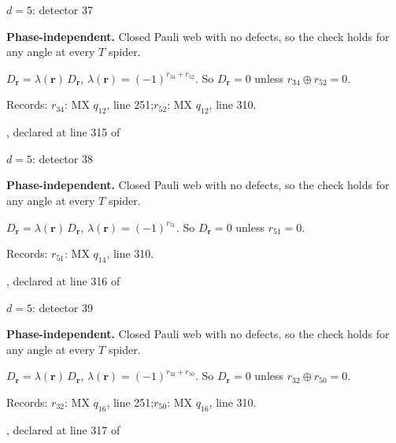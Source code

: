 \label{d5_det037}
{\Large $d=5$: detector 37}\par
\textbf{Phase-independent.} Closed Pauli web with no defects, so the check holds for any angle at every $T$ spider.
\begin{center}
\end{center}
\vspace{-1mm}
$D_{\boldsymbol r}=\lambda(\boldsymbol r)\,D_{\boldsymbol r}$, \quad $\lambda(\boldsymbol r)=(-1)^{r_{34}+r_{52}}$. \qquad So $D_{\boldsymbol r}=0$ unless $r_{34}\oplus r_{52}=0$.
\par\smallskip\begin{minipage}{.98\linewidth}\small Records: $r_{34}$: MX $q_{12}$, line 251;\quad $r_{52}$: MX $q_{12}$, line 310.\end{minipage}
\vfill
{\footnotesize\texttt{}, declared at line 315 of \texttt{}}
\newpage

\label{d5_det038}
{\Large $d=5$: detector 38}\par
\textbf{Phase-independent.} Closed Pauli web with no defects, so the check holds for any angle at every $T$ spider.
\begin{center}
\end{center}
\vspace{-1mm}
$D_{\boldsymbol r}=\lambda(\boldsymbol r)\,D_{\boldsymbol r}$, \quad $\lambda(\boldsymbol r)=(-1)^{r_{51}}$. \qquad So $D_{\boldsymbol r}=0$ unless $r_{51}=0$.
\par\smallskip\begin{minipage}{.98\linewidth}\small Records: $r_{51}$: MX $q_{14}$, line 310.\end{minipage}
\vfill
{\footnotesize\texttt{}, declared at line 316 of \texttt{}}
\newpage

\label{d5_det039}
{\Large $d=5$: detector 39}\par
\textbf{Phase-independent.} Closed Pauli web with no defects, so the check holds for any angle at every $T$ spider.
\begin{center}
\end{center}
\vspace{-1mm}
$D_{\boldsymbol r}=\lambda(\boldsymbol r)\,D_{\boldsymbol r}$, \quad $\lambda(\boldsymbol r)=(-1)^{r_{32}+r_{50}}$. \qquad So $D_{\boldsymbol r}=0$ unless $r_{32}\oplus r_{50}=0$.
\par\smallskip\begin{minipage}{.98\linewidth}\small Records: $r_{32}$: MX $q_{16}$, line 251;\quad $r_{50}$: MX $q_{16}$, line 310.\end{minipage}
\vfill
{\footnotesize\texttt{}, declared at line 317 of \texttt{}}
\newpage

